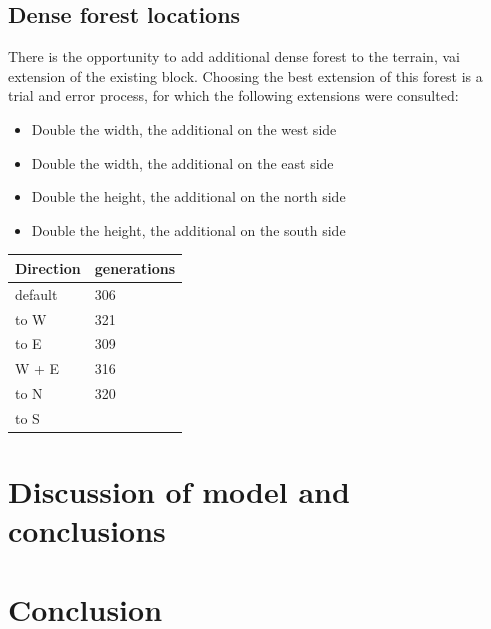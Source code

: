 \documentclass[11pt, a4paper, titlepage]{article}
\begin{document}
\subsection{Dense forest locations}
There is the opportunity to add additional dense forest to the terrain, vai extension of the existing block. Choosing the best extension of this forest is a trial and error process, for which the following extensions were consulted:
 \begin{itemize}
   \item Double the width, the additional on the west side
   \item Double the width, the additional on the east side
   \item Double the height, the additional on the north side
   \item Double the height, the additional on the south side
 \end{itemize}

 \begin{table}[H]
  \begin{tabular}{|l|l|}
  \hline
  Direction & generations \\ \hline
  default & 306 \\ \hline
  to W    & 321 \\ \hline
  to E    & 309 \\ \hline
  W + E   & 316 \\ \hline
  to N    & 320 \\ \hline
  to S    &     \\ \hline
  \end{tabular}
  \end{table}

\section{Discussion of model and conclusions} 
\section{Conclusion}

\newpage
\renewcommand{\bibname}{References}


\end{document}
